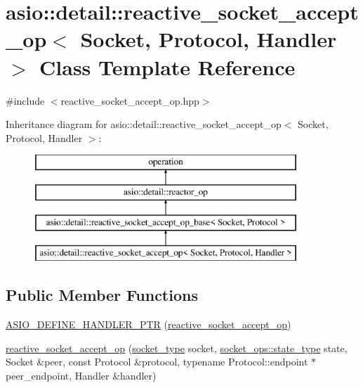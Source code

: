 \hypertarget{classasio_1_1detail_1_1reactive__socket__accept__op}{}\section{asio\+:\+:detail\+:\+:reactive\+\_\+socket\+\_\+accept\+\_\+op$<$ Socket, Protocol, Handler $>$ Class Template Reference}
\label{classasio_1_1detail_1_1reactive__socket__accept__op}


{\ttfamily \#include $<$reactive\+\_\+socket\+\_\+accept\+\_\+op.\+hpp$>$}

Inheritance diagram for asio\+:\+:detail\+:\+:reactive\+\_\+socket\+\_\+accept\+\_\+op$<$ Socket, Protocol, Handler $>$\+:\begin{figure}[H]
\begin{center}
\leavevmode
\includegraphics[height=4.000000cm]{classasio_1_1detail_1_1reactive__socket__accept__op}
\end{center}
\end{figure}
\subsection*{Public Member Functions}
\begin{DoxyCompactItemize}
\item 
\hyperlink{classasio_1_1detail_1_1reactive__socket__accept__op_acb8ea0fc64142371c17ad15cf20cb93f}{A\+S\+I\+O\+\_\+\+D\+E\+F\+I\+N\+E\+\_\+\+H\+A\+N\+D\+L\+E\+R\+\_\+\+P\+T\+R} (\hyperlink{classasio_1_1detail_1_1reactive__socket__accept__op}{reactive\+\_\+socket\+\_\+accept\+\_\+op})
\item 
\hyperlink{classasio_1_1detail_1_1reactive__socket__accept__op_a4ce11cb97a4219aeb6b80966e32982a4}{reactive\+\_\+socket\+\_\+accept\+\_\+op} (\hyperlink{namespaceasio_1_1detail_a6798c771dd84b79798b1a08150706ea9}{socket\+\_\+type} socket, \hyperlink{namespaceasio_1_1detail_1_1socket__ops_a5ce32ee297edef8833113ea35a933054}{socket\+\_\+ops\+::state\+\_\+type} state, Socket \&peer, const Protocol \&protocol, typename Protocol\+::endpoint $\ast$peer\+\_\+endpoint, Handler \&handler)
\end{DoxyCompactItemize}
